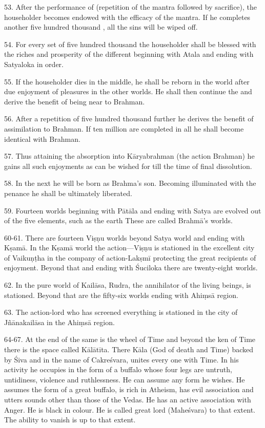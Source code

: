 53. After the performance of  (repetition of the mantra followed
by sacrifice), the householder becomes endowed with the efficacy of the mantra.
If he completes another five hundred thousand , all the sins will be
wiped off.

54. For every set of five hundred thousand  the householder shall be
blessed with the riches and prosperity of the different  beginning
with Atala and ending with Satyaloka in order.

55. If the householder dies in the middle, he shall be reborn in the world after
due enjoyment of pleasures in the other worlds. He shall then continue
the  and derive the benefit of being near to Brahman.

56. After a repetition of five hundred thousand further  he derives
the benefit of assimilation to Brahman. If ten million  are completed
in all he shall become identical with Brahman.

57. Thus attaining the absorption into Kāryabrahman (the action Brahman) he
gains all such enjoyments as can be wished for till the time of final
dissolution.

58. In the next  he will be born as Brahma’s son. Becoming illuminated
with the penance he shall be ultimately liberated.

59. Fourteen worlds beginning with Pātāla and ending with Satya are evolved out
of the five elements, such as the earth \etc These are called Brahmā’s worlds.

60-61. There are fourteen Viṣṇu worlds beyond Satya world and ending with Kṣamā.
In the Kṣamā world the action—Viṣṇu is stationed in the excellent city of
Vaikuṇṭha in the company of action-Lakṣmī protecting the great recipients of
enjoyment. Beyond that and ending with Śuciloka there are twenty-eight worlds.

62. In the pure world of Kailāsa, Rudra, the annihilator of the living beings,
is stationed. Beyond that are the fifty-six worlds ending with Ahiṃsā region.

63. The action-lord who has screened everything is stationed in the city of
Jñānakailāsa in the Ahiṃsā region.

64-67. At the end of the same is the wheel of Time and beyond the ken of Time
there is the space called Kālātīta. There Kāla (God of death and Time) backed by
Śiva and in the name of Cakreśvara, unites every one with Time. In his activity
he occupies  in the form of a buffalo whose four legs are untruth,
untidiness, violence and ruthlessness. He can assume any form he wishes. He
assumes the form of a great buffalo, is rich in Atheism, has evil association
and utters sounds other than those of the Vedas. He has an active association
with Anger. He is black in colour. He is called great lord (Maheśvara) to that
extent. The ability to vanish is up to that extent.

